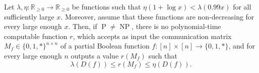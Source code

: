 \setcounter{nttheorem}{34}
\begin{nttheorem}
Let $\lambda,\eta:\mathbb R_{\geq0}\to\mathbb R_{\geq0}$ be functions such that $\eta(1+\log x)<\lambda(0.99x)$ for all sufficiently large $x$. Moreover, assume that these functions are non-decreasing for every large enough $x$. Then, if $\operatorname P\ne\operatorname{NP}$, there is no polynomial-time computable function $r$, which accepts as input the communication matrix $M_f\in\{0,1,*\}^{n\times n}$ of a partial Boolean function $f:[n]\times[n]\to\{0,1,*\}$, and for every large enough $n$ outputs a value $r(M_f)$ such that
\[\lambda(D(f))\leq r(M_f)\leq\eta(D(f)).\]
\end{nttheorem}
